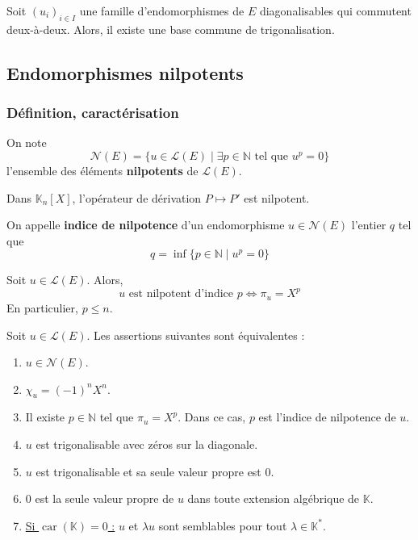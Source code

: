 	\begin{theorem}
		Soit $(u_i)_{i \in I}$ une famille d'endomorphismes de $E$ diagonalisables qui commutent deux-à-deux. Alors, il existe une base commune de trigonalisation.
	\end{theorem}
	
	\newpage
	
	\subsection{Endomorphismes nilpotents}
	
	\subsubsection{Définition, caractérisation}
	
	
	\begin{definition}
		On note
		\[ \mathcal{N}(E) = \{ u \in \mathcal{L}(E) \mid \exists p \in \mathbb{N} \text{ tel que } u^p = 0 \} \]
		l'ensemble des éléments \textbf{nilpotents} de $\mathcal{L}(E)$.
	\end{definition}
	
	\begin{example}
		Dans $\mathbb{K}_n[X]$, l'opérateur de dérivation $P \mapsto P'$ est nilpotent.
	\end{example}
	
	\begin{definition}
		On appelle \textbf{indice de nilpotence} d'un endomorphisme $u \in \mathcal{N}(E)$ l'entier $q$ tel que
		\[ q = \inf \{ p \in \mathbb{N} \mid u^p = 0 \} \]
	\end{definition}
	
	\begin{proposition}
		Soit $u \in \mathcal{L}(E)$. Alors,
		\[ u \text{ est nilpotent d'indice } p \iff \pi_u = X^p \]
		En particulier, $p \leq n$.
	\end{proposition}
	
	\begin{theorem}
		\label{156-1}
		Soit $u \in \mathcal{L}(E)$. Les assertions suivantes sont équivalentes :
		\begin{enumerate}[label=(\roman*)]
			\item $u \in \mathcal{N}(E)$.
			\item $\chi_u = (-1)^n X^n$.
			\item Il existe $p \in \mathbb{N}$ tel que $\pi_u = X^p$. Dans ce cas, $p$ est l'indice de nilpotence de $u$.
			\item $u$ est trigonalisable avec zéros sur la diagonale.
			\item $u$ est trigonalisable et sa seule valeur propre est $0$.
			\item $0$ est la seule valeur propre de $u$ dans toute extension algébrique de $\mathbb{K}$.
			\item \underline{Si $\operatorname{car}(\mathbb{K}) = 0$ :} $u$ et $\lambda u$ sont semblables pour tout $\lambda \in \mathbb{K}^*$.
		\end{enumerate}
	\end{theorem}
	
